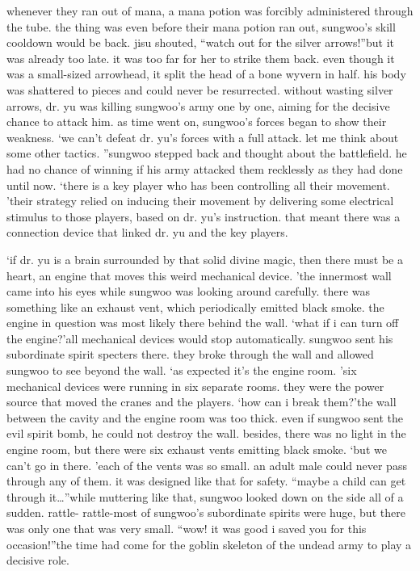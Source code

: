  whenever they ran out of mana, a mana potion was forcibly administered through the tube.
the thing was even before their mana potion ran out, sungwoo’s skill cooldown would be back.
jisu shouted, “watch out for the silver arrows!”but it was already too late.
 it was too far for her to strike them back.
even though it was a small-sized arrowhead, it split the head of a bone wyvern in half.
 his body was shattered to pieces and could never be resurrected.
without wasting silver arrows, dr.
 yu was killing sungwoo’s army one by one, aiming for the decisive chance to attack him.
 as time went on, sungwoo’s forces began to show their weakness.
‘we can’t defeat dr.
 yu’s forces with a full attack.
 let me think about some other tactics.
”sungwoo stepped back and thought about the battlefield.
 he had no chance of winning if his army attacked them recklessly as they had done until now.
‘there is a key player who has been controlling all their movement.
’their strategy relied on inducing their movement by delivering some electrical stimulus to those players, based on dr.
 yu’s instruction.
that meant there was a connection device that linked dr.
 yu and the key players.


‘if dr.
 yu is a brain surrounded by that solid divine magic, then there must be a heart, an engine that moves this weird mechanical device.
’the innermost wall came into his eyes while sungwoo was looking around carefully.
 there was something like an exhaust vent, which periodically emitted black smoke.
the engine in question was most likely there behind the wall.
‘what if i can turn off the engine?’all mechanical devices would stop automatically.
sungwoo sent his subordinate spirit specters there.
 they broke through the wall and allowed sungwoo to see beyond the wall.
‘as expected it’s the engine room.
’six mechanical devices were running in six separate rooms.
 they were the power source that moved the cranes and the players.
‘how can i break them?’the wall between the cavity and the engine room was too thick.
 even if sungwoo sent the evil spirit bomb, he could not destroy the wall.
besides, there was no light in the engine room, but there were six exhaust vents emitting black smoke.
‘but we can’t go in there.
’each of the vents was so small.
 an adult male could never pass through any of them.
 it was designed like that for safety.
“maybe a child can get through it…”while muttering like that, sungwoo looked down on the side all of a sudden.
rattle- rattle-most of sungwoo’s subordinate spirits were huge, but there was only one that was very small.
“wow! it was good i saved you for this occasion!”the time had come for the goblin skeleton of the undead army to play a decisive role.


 